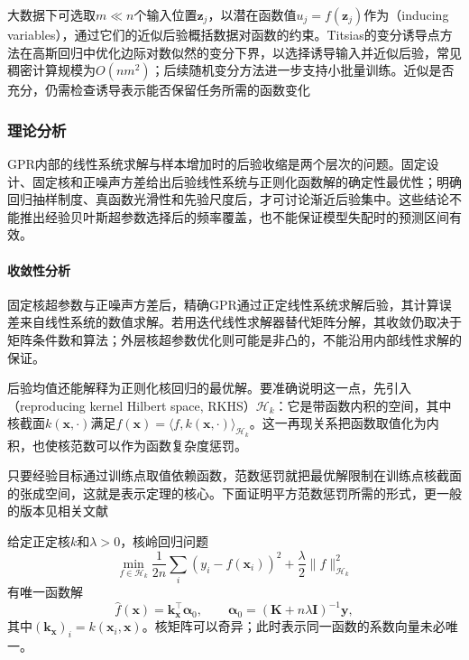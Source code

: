 大数据下可选取$m\ll n$个输入位置$\bm{z}_j$，以潜在函数值$u_j=f(\bm{z}_j)$作为（inducing variables），通过它们的近似后验概括数据对函数的约束。Titsias的变分诱导点方法在高斯回归中优化边际对数似然的变分下界，以选择诱导输入并近似后验，常见稠密计算规模为$O(nm^2)$；后续随机变分方法进一步支持小批量训练。近似是否充分，仍需检查诱导表示能否保留任务所需的函数变化

\subsubsection{理论分析}
\label{sec:regression-gpr-theory}

GPR内部的线性系统求解与样本增加时的后验收缩是两个层次的问题。固定设计、固定核和正噪声方差给出后验线性系统与正则化函数解的确定性最优性；明确回归抽样制度、真函数光滑性和先验尺度后，才可讨论渐近后验集中。这些结论不能推出经验贝叶斯超参数选择后的频率覆盖，也不能保证模型失配时的预测区间有效。

\paragraph{收敛性分析}
固定核超参数与正噪声方差后，精确GPR通过正定线性系统求解后验，其计算误差来自线性系统的数值求解。若用迭代线性求解器替代矩阵分解，其收敛仍取决于矩阵条件数和算法；外层核超参数优化则可能是非凸的，不能沿用内部线性求解的保证。

后验均值还能解释为正则化核回归的最优解。要准确说明这一点，先引入（reproducing kernel Hilbert space, RKHS）$\mathcal H_k$：它是带函数内积的空间，其中核截面$k(\bm{x},\cdot)$满足$f(\bm{x})=\langle f,k(\bm{x},\cdot)\rangle_{\mathcal H_k}$。这一再现关系把函数取值化为内积，也使核范数可以作为函数复杂度惩罚。

只要经验目标通过训练点取值依赖函数，范数惩罚就把最优解限制在训练点核截面的张成空间，这就是表示定理的核心。下面证明平方范数惩罚所需的形式，更一般的版本见相关文献

\begin{theorem}[表示定理与核岭回归解]
  \label{thm:regression-krr}
  给定正定核$k$和$\lambda>0$，核岭回归问题
  \[
    \min_{f\in\mathcal H_k}
      \frac1{2n}\sum_i(y_i-f(\bm{x}_i))^2
       +\frac{\lambda}{2}\lVert f\rVert_{\mathcal H_k}^2
  \]
  有唯一函数解
  \[
    \widehat f(\bm{x})=\bm{k}_{\bm{x}}^{\top}\bm{\alpha}_0,\qquad
    \bm{\alpha}_0=(\bm{K}+n\lambda\bm{I})^{-1}\bm{y},
  \]
  其中$(\bm{k}_{\bm{x}})_i=k(\bm{x}_i,\bm{x})$。核矩阵可以奇异；此时表示同一函数的系数向量未必唯一。
\end{theorem}

